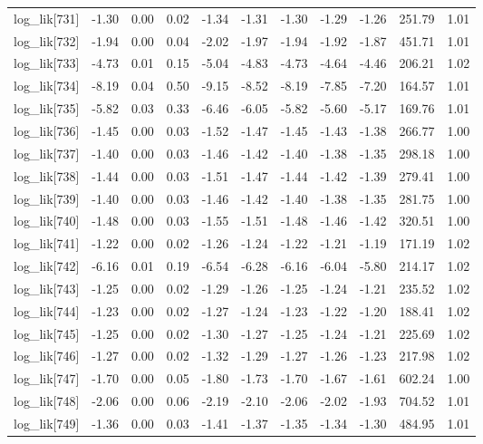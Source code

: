 \begin{table}[ht]
\begin{tabular}{rrrrrrrrrrr}
  log\_lik[731] & -1.30 & 0.00 & 0.02 & -1.34 & -1.31 & -1.30 & -1.29 & -1.26 & 251.79 & 1.01 \\ 
  log\_lik[732] & -1.94 & 0.00 & 0.04 & -2.02 & -1.97 & -1.94 & -1.92 & -1.87 & 451.71 & 1.01 \\ 
  log\_lik[733] & -4.73 & 0.01 & 0.15 & -5.04 & -4.83 & -4.73 & -4.64 & -4.46 & 206.21 & 1.02 \\ 
  log\_lik[734] & -8.19 & 0.04 & 0.50 & -9.15 & -8.52 & -8.19 & -7.85 & -7.20 & 164.57 & 1.01 \\ 
  log\_lik[735] & -5.82 & 0.03 & 0.33 & -6.46 & -6.05 & -5.82 & -5.60 & -5.17 & 169.76 & 1.01 \\ 
  log\_lik[736] & -1.45 & 0.00 & 0.03 & -1.52 & -1.47 & -1.45 & -1.43 & -1.38 & 266.77 & 1.00 \\ 
  log\_lik[737] & -1.40 & 0.00 & 0.03 & -1.46 & -1.42 & -1.40 & -1.38 & -1.35 & 298.18 & 1.00 \\ 
  log\_lik[738] & -1.44 & 0.00 & 0.03 & -1.51 & -1.47 & -1.44 & -1.42 & -1.39 & 279.41 & 1.00 \\ 
  log\_lik[739] & -1.40 & 0.00 & 0.03 & -1.46 & -1.42 & -1.40 & -1.38 & -1.35 & 281.75 & 1.00 \\ 
  log\_lik[740] & -1.48 & 0.00 & 0.03 & -1.55 & -1.51 & -1.48 & -1.46 & -1.42 & 320.51 & 1.00 \\ 
  log\_lik[741] & -1.22 & 0.00 & 0.02 & -1.26 & -1.24 & -1.22 & -1.21 & -1.19 & 171.19 & 1.02 \\ 
  log\_lik[742] & -6.16 & 0.01 & 0.19 & -6.54 & -6.28 & -6.16 & -6.04 & -5.80 & 214.17 & 1.02 \\ 
  log\_lik[743] & -1.25 & 0.00 & 0.02 & -1.29 & -1.26 & -1.25 & -1.24 & -1.21 & 235.52 & 1.02 \\ 
  log\_lik[744] & -1.23 & 0.00 & 0.02 & -1.27 & -1.24 & -1.23 & -1.22 & -1.20 & 188.41 & 1.02 \\ 
  log\_lik[745] & -1.25 & 0.00 & 0.02 & -1.30 & -1.27 & -1.25 & -1.24 & -1.21 & 225.69 & 1.02 \\ 
  log\_lik[746] & -1.27 & 0.00 & 0.02 & -1.32 & -1.29 & -1.27 & -1.26 & -1.23 & 217.98 & 1.02 \\ 
  log\_lik[747] & -1.70 & 0.00 & 0.05 & -1.80 & -1.73 & -1.70 & -1.67 & -1.61 & 602.24 & 1.00 \\ 
  log\_lik[748] & -2.06 & 0.00 & 0.06 & -2.19 & -2.10 & -2.06 & -2.02 & -1.93 & 704.52 & 1.01 \\ 
  log\_lik[749] & -1.36 & 0.00 & 0.03 & -1.41 & -1.37 & -1.35 & -1.34 & -1.30 & 484.95 & 1.01 \\ 

\end{tabular}
\end{table}
